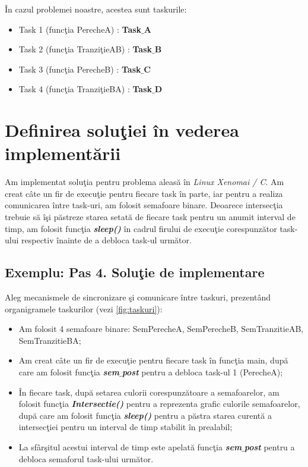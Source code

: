 \documentclass[a4paper, 11pt]{article}
\begin{document}
\^{I}n cazul problemei noastre, acestea sunt taskurile:

\begin{itemize}
\item Task 1 (func\c{t}ia PerecheA) : \textbf{Task$\_$A}
\item Task 2 (func\c{t}ia Tranzi\c{t}ieAB) : \textbf{Task$\_$B}
\item Task 3 (func\c{t}ia PerecheB) : \textbf{Task$\_$C}
\item Task 4 (func\c{t}ia Tranzi\c{t}ieBA) : \textbf{Task$\_$D}
\end{itemize}

\section{Definirea solu\c{t}iei \^{i}n vederea implement\u{a}rii}

Am implementat solu\c{t}ia pentru problema aleas\u{a} \^{i}n \textit{Linux Xenomai / C}. Am creat c\^{a}te un fir de execu\c{t}ie pentru fiecare task \^{i}n parte, iar pentru a realiza comunicarea \^{i}ntre task-uri, am folosit semafoare binare. Deoarece intersec\c{t}ia trebuie s\u{a} \^{i}\c{s}i p\u{a}streze starea setat\u{a} de fiecare task pentru un anumit interval de timp, am folosit func\c{t}ia \textbf{\textit{sleep()}} \^{i}n cadrul firului de execu\c{t}ie corespunz\u{a}tor task-ului respectiv \^{i}nainte de a debloca task-ul urm\u{a}tor.

\subsection{Exemplu: Pas 4. Solu\c{t}ie de implementare}

Aleg mecanismele de sincronizare \c{s}i comunicare \^{i}ntre taskuri, prezent\^{a}nd organigramele taskurilor (vezi \autoref{fig:taskuri}):

\begin{itemize}
\item Am folosit 4 semafoare binare: SemPerecheA, SemPerecheB, SemTranzitieAB, SemTranzitieBA;
\item Am creat c\^{a}te un fir de execu\c{t}ie pentru fiecare task \^{i}n func\c{t}ia main, dup\u{a} care am folosit func\c{t}ia \textbf{\textit{sem$\_$post}} pentru a debloca task-ul 1 (PerecheA);
\item \^{I}n fiecare task, dup\u{a} setarea culorii corespunz\u{a}toare a semafoarelor, am folosit func\c{t}ia \textbf{\textit{Intersectie()}} pentru a reprezenta grafic culorile semafoarelor, dup\u{a} care am folosit func\c{t}ia \textbf{\textit{sleep()}} pentru a p\u{a}stra starea curent\u{a} a intersec\c{t}iei pentru un interval de timp stabilit \^{i}n prealabil;
\item La sf\^{a}r\c{s}itul acestui interval de timp este apelat\u{a} func\c{t}ia \textbf{\textit{sem$\_$post}} pentru a debloca semaforul task-ului urm\u{a}tor.
\end{itemize}
\end{document}
